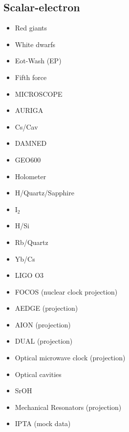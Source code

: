 \documentclass[8pt,twocolumn]{extarticle}
\begin{document}
\begin{mdframed}
\subsection*{Scalar-electron}\vspace{-0.5em}
\begin{itemize}\setlength\itemsep{-0.5em}
	\item Red giants~\cite{Hardy:2016kme}
	\item White dwarfs~\cite{Bottaro:2023gep}
	\item Eot-Wash (EP)~\cite{Hees:2018fpg}
	\item Fifth force~\cite{Adelberger:2003zx,Fischbach:1996eq,Fienga:2023ocw,Mars}
	\item MICROSCOPE~\cite{Berge:2017ovy}
		\item AURIGA~\cite{Branca:2016rez}
	\item Cs/Cav~\cite{Tretiak:2022ndx}
	\item DAMNED~\cite{Savalle:2020vgz}
	\item GEO600~\cite{Vermeulen:2021epa}
	\item Holometer~\cite{Aiello:2021wlp}
	\item H/Quartz/Sapphire~\cite{Campbell:2020fvq}
	\item I$_2$~\cite{Oswald:2021vtc}
	\item H/Si~\cite{Kennedy:2020bac}
	\item Rb/Quartz~\cite{Zhang:2022ewz}
	\item Yb/Cs~\cite{Kobayashi:2022vsf}
		\item LIGO O3~\cite{Fukusumi:2023kqd}
		\item FOCOS (nuclear clock projection)~\cite{Brzeminski:2022sde}
	\item AEDGE (projection)~\cite{Badurina:2021rgt}
	\item AION (projection)~\cite{Badurina:2021rgt}
	\item DUAL (projection)~\cite{Arvanitaki:2015iga}
		\item Optical microwave clock (projection)~\cite{Arvanitaki:2014faa}
\item Optical cavities~\cite{Geraci:2018fax}
\item SrOH~\cite{SrOH}
		\item Mechanical Resonators (projection)~\cite{Manley:2019vxy}
			\item IPTA (mock data)~\cite{Kaplan:2022lmz}

\end{itemize}
\end{mdframed}
\end{document}

